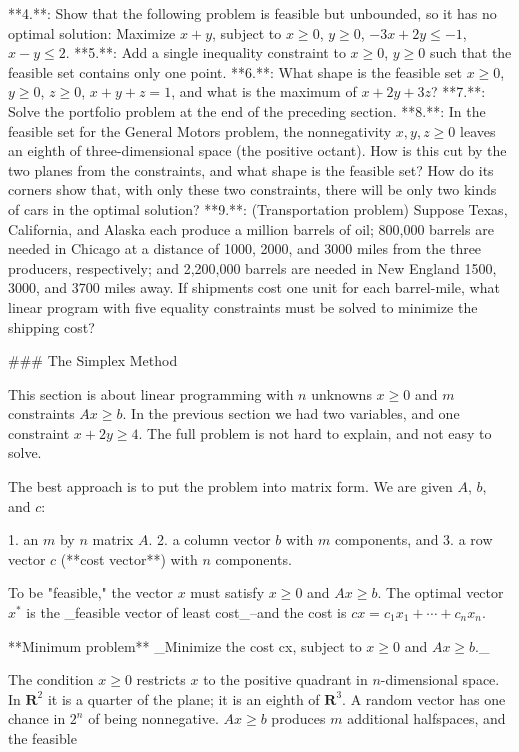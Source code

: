 

**4.**: Show that the following problem is feasible but unbounded, so it has no optimal solution: Maximize \(x+y\), subject to \(x\geq 0\), \(y\geq 0\), \(-3x+2y\leq-1\), \(x-y\leq 2\).
**5.**: Add a single inequality constraint to \(x\geq 0\), \(y\geq 0\) such that the feasible set contains only one point.
**6.**: What shape is the feasible set \(x\geq 0\), \(y\geq 0\), \(z\geq 0\), \(x+y+z=1\), and what is the maximum of \(x+2y+3z\)?
**7.**: Solve the portfolio problem at the end of the preceding section.
**8.**: In the feasible set for the General Motors problem, the nonnegativity \(x,y,z\geq 0\) leaves an eighth of three-dimensional space (the positive octant). How is this cut by the two planes from the constraints, and what shape is the feasible set? How do its corners show that, with only these two constraints, there will be only two kinds of cars in the optimal solution?
**9.**: (Transportation problem) Suppose Texas, California, and Alaska each produce a million barrels of oil; 800,000 barrels are needed in Chicago at a distance of 1000, 2000, and 3000 miles from the three producers, respectively; and 2,200,000 barrels are needed in New England 1500, 3000, and 3700 miles away. If shipments cost one unit for each barrel-mile, what linear program with five equality constraints must be solved to minimize the shipping cost?

### The Simplex Method

This section is about linear programming with \(n\) unknowns \(x\geq 0\) and \(m\) constraints \(Ax\geq b\). In the previous section we had two variables, and one constraint \(x+2y\geq 4\). The full problem is not hard to explain, and not easy to solve.

The best approach is to put the problem into matrix form. We are given \(A\), \(b\), and \(c\):

1. an \(m\) by \(n\) matrix \(A\).
2. a column vector \(b\) with \(m\) components, and
3. a row vector \(c\) (**cost vector**) with \(n\) components.

To be "feasible," the vector \(x\) must satisfy \(x\geq 0\) and \(Ax\geq b\). The optimal vector \(x^{*}\) is the _feasible vector of least cost_--and the cost is \(cx=c_{1}x_{1}+\cdots+c_{n}x_{n}\).

**Minimum problem** _Minimize the cost cx, subject to \(x\geq 0\) and \(Ax\geq b\)._

The condition \(x\geq 0\) restricts \(x\) to the positive quadrant in \(n\)-dimensional space. In \(\mathbf{R}^{2}\) it is a quarter of the plane; it is an eighth of \(\mathbf{R}^{3}\). A random vector has one chance in \(2^{n}\) of being nonnegative. \(Ax\geq b\) produces \(m\) additional halfspaces, and the feasible